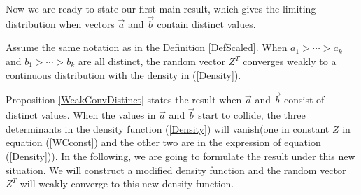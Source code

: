 Now we are ready to state our first main result, which gives the limiting distribution when vectors $\vec{a}$ and $\vec{b}$ contain distinct values.

\begin{proposition}{\label{WeakConvDistinct}}
Assume the same notation as in the Definition \ref{DefScaled}. When $a_{1}> \cdots > a_{k}$ and $b_{1}> \cdots > b_{k}$ are all distinct, the random vector $Z^{T}$ converges weakly to a continuous distribution with the density in (\ref{Density}).	
\end{proposition}

Proposition \ref{WeakConvDistinct} states the result when $\vec{a}$ and $\vec{b}$ consist of distinct values. When the values in $\vec{a}$ and $\vec{b}$ start to collide, the three determinants in the density function (\ref{Density}) will vanish(one in constant $Z$ in equation (\ref{WCconst}) and the other two are in the expression of equation (\ref{Density})). In the following, we are going to formulate the result under this new situation. We will construct a modified density function and the random vector $Z^{T}$ will weakly converge to this new density function.

